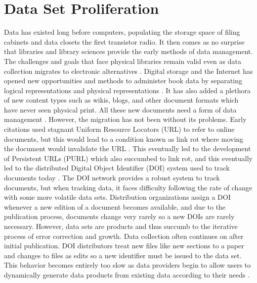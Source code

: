 \section{Data Set Proliferation}

Data has existed long before computers, populating the storage space of filing cabinets and data closets the first transistor radio.
It then comes as no surprise that libraries and library sciences provide the early methods of data management.
The challenges and goals that face physical libraries remain valid even as data collection migrates to electronic alternatives \cite{rohtua}.
Digital storage and the Internet has opened new opportunities and methods to administer book data by separating logical representations and physical representations \cite{Barkstrom_digitallibrary}.
It has also added a plethora of new content types such as wikis, blogs, and other document formats which have never seen physical print.
All these new documents need a form of data management \cite{Berberich:2007:TMT:1277741.1277831}.
However, the migration has not been without its problems.
Early citations used stagnant Uniform Resource Locators (URL) to refer to online documents, but this would lead to a condition known as link rot where moving the document would invalidate the URL \cite{Lyons2005}.
This eventually led to the development of Persistent URLs (PURL) which also succumbed to link rot, and this eventually led to the distributed Digital Object Identifier (DOI) system used to track documents today \cite{Duerr2011}.
The DOI network provides a robust system to track documents, but when tracking data, it faces difficulty following the rate of change with some more volatile data sets.
Distribution organizations assign a DOI whenever a new edition of a document becomes available, and due to the publication process, documents change very rarely so a new DOIs are rarely necessary.
However, data sets are products and thus succumb to the iterative process of error correction and growth.
Data collection often continues on after initial publication.
DOI distributors treat new files like new sections to a paper and changes to files as edits so a new identifier must be issued to the data set.
This behavior becomes entirely too slow as data providers begin to allow users to dynamically generate data products from existing data according to their needs \cite{Barkstrom2003}.

